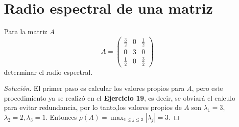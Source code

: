 \documentclass[12pt]{book}
\newcommand\abs[1]{\left\lvert#1\right\rvert}
\newenvironment{solucion}
  {\renewcommand\qedsymbol{$\square$}\begin{proof}[Solución]}
  {\end{proof}}
\begin{document}
\section{Radio espectral  de una matriz}
\eje Para la matriz $A$
\[
A=\begin{pmatrix}
\frac{3}{2} & 0 &\frac{1}{2}\\
0 & 3 & 0\\
\frac{1}{2} & 0 & \frac{3}{2}
\end{pmatrix}
\]
determinar el radio espectral.
\begin{solucion}
El primer paso es calcular los valores propios  para $A$, pero este procedimiento ya se realizó en el \textbf{Ejercicio 19}, es decir, se obviará el calculo para evitar redundancia, por lo tanto,los valores propios de $A$ son $\lambda_1=3$,  $\lambda_2=2, \lambda_3=1$. Entonces $\rho(A)=\max_{1\leq j\leq3}\abs{\lambda_j}=3$.
\end{solucion}
\end{document}
